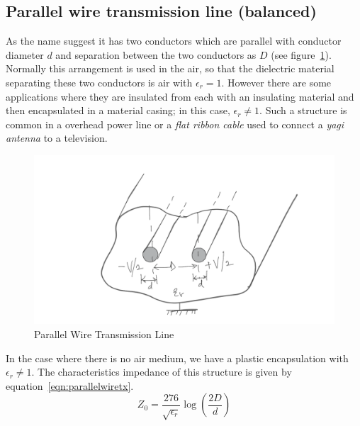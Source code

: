 \subsection{Parallel wire transmission line (balanced)} 
As the name suggest it has two conductors which are parallel with conductor diameter $d$ and separation between the two conductors as $D$ (see figure~\ref{fig:parallelwiretx}). Normally this arrangement is used in the air, so that the dielectric material separating these two conductors is air with $\epsilon_r=1$. However there are some applications where they are insulated from each with an insulating material and then encapsulated in a material casing; in this case, $\epsilon_r\neq1$. Such a structure is common in a overhead power line or a \emph{flat ribbon cable} used to connect a \emph{yagi antenna} to a television.
\begin{figure}[h]
\centering
\includegraphics[width=1\linewidth]{./graphics/parallel_wire_tx_temp}
\caption{Parallel Wire Transmission Line}
\label{fig:parallelwiretx}
\end{figure}

In the case where there is no air medium, we have a plastic encapsulation with $\epsilon_r\neq1$. The characteristics impedance of this structure is given by equation~\ref{eqn:parallelwiretx}.
\begin{equation}
Z_0 =\dfrac{276}{\sqrt{\epsilon_r}}\log(\dfrac{2D}{d})
\label{eqn:parallelwiretx}
\end{equation}

